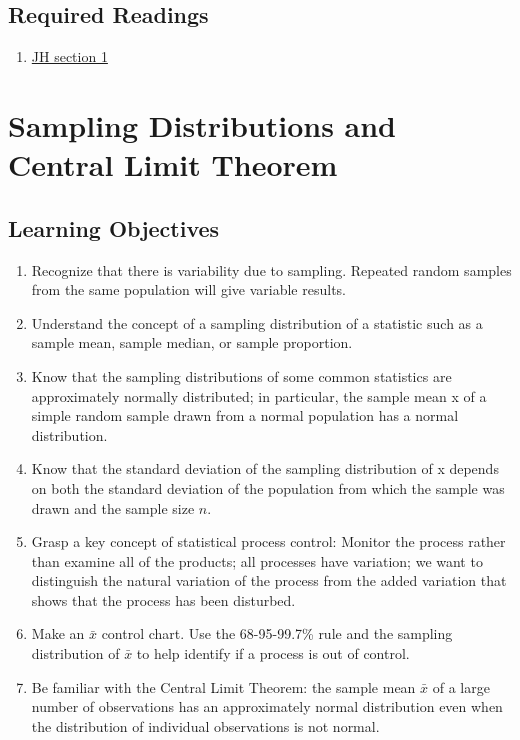 \documentclass[letterpaper,9pt,twocolumn,twoside,printwatermark=false]{pinp}
\providecommand{\tightlist}{%
  \setlength{\itemsep}{0pt}\setlength{\parskip}{0pt}}
\begin{document}
\hypertarget{required-readings}{%
\subsection{Required Readings}\label{required-readings}}

\begin{enumerate}
\def\labelenumi{\arabic{enumi}.}
\tightlist
\item
  \href{https://www.dropbox.com/s/kr293cablb11nrm/Ch13SamplingDistributionsJH2018.pdf?dl=0}{JH
  section 1}
\end{enumerate}

\vspace*{0.25cm}

\hypertarget{sampling-distributions-and-central-limit-theorem}{%
\section{Sampling Distributions and Central Limit
Theorem}\label{sampling-distributions-and-central-limit-theorem}}

\hypertarget{learning-objectives-1}{%
\subsection{Learning Objectives}\label{learning-objectives-1}}

\begin{enumerate}
\def\labelenumi{\arabic{enumi}.}
\tightlist
\item
  Recognize that there is variability due to sampling. Repeated random
  samples from the same population will give variable results.
\item
  Understand the concept of a sampling distribution of a statistic such
  as a sample mean, sample median, or sample proportion.
\item
  Know that the sampling distributions of some common statistics are
  approximately normally distributed; in particular, the sample mean x
  of a simple random sample drawn from a normal population has a normal
  distribution.
\item
  Know that the standard deviation of the sampling distribution of x
  depends on both the standard deviation of the population from which
  the sample was drawn and the sample size \(n\).
\item
  Grasp a key concept of statistical process control: Monitor the
  process rather than examine all of the products; all processes have
  variation; we want to distinguish the natural variation of the process
  from the added variation that shows that the process has been
  disturbed.
\item
  Make an \(\bar{x}\) control chart. Use the 68-95-99.7\% rule and the
  sampling distribution of \(\bar{x}\) to help identify if a process is
  out of control.
\item
  Be familiar with the Central Limit Theorem: the sample mean
  \(\bar{x}\) of a large number of observations has an approximately
  normal distribution even when the distribution of individual
  observations is not normal.
\end{enumerate}
\end{document}
